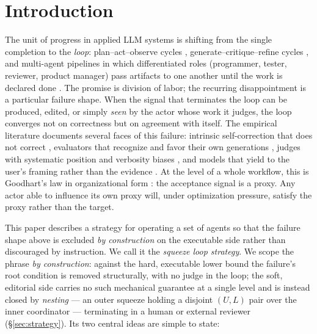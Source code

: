 \documentclass[11pt]{article}
\begin{document}
\section{Introduction}
\label{sec:intro}

The unit of progress in applied LLM systems is shifting from the single
completion to the \emph{loop}: plan--act--observe cycles
\citep{yao2022react,wang2023voyager}, generate--critique--refine cycles
\citep{madaan2023selfrefine,shinn2023reflexion}, and multi-agent pipelines in
which differentiated roles (programmer, tester, reviewer, product manager)
pass artifacts to one another until the work is declared done
\citep{li2023camel,wu2023autogen,hong2023metagpt,qian2023chatdev}. The promise
is division of labor; the recurring disappointment is a particular failure
shape. When the signal that terminates the loop can be produced, edited, or
simply \emph{seen} by the actor whose work it judges, the loop converges not on
correctness but on agreement with itself. The empirical literature documents
several faces of this failure: intrinsic self-correction that does not correct
\citep{huang2023cannot}, evaluators that recognize and favor their own
generations \citep{panickssery2024llm}, judges with systematic position and
verbosity biases \citep{zheng2023judging}, and models that yield to the user's
framing rather than the evidence \citep{sharma2023sycophancy}. At the level of
a whole workflow, this is Goodhart's law in organizational form
\citep{manheim2018goodhart,krakovna2020specification,amodei2016concrete}: the
acceptance signal is a proxy. Any actor able to influence its own proxy will,
under optimization pressure, satisfy the proxy rather than the target.

This paper describes a strategy for operating a set of agents so that the
failure shape above is excluded \emph{by construction} on the executable side
rather than discouraged by instruction. We call it the \emph{squeeze loop
strategy}. We scope the phrase \emph{by construction}: against the hard,
executable lower bound the failure's root condition is removed structurally,
with no judge in the loop; the soft, editorial side carries no such mechanical
guarantee at a single level and is instead closed by \emph{nesting} --- an
outer squeeze holding a disjoint $(U,L)$ pair over the inner coordinator ---
terminating in a human or external reviewer (\S\ref{sec:strategy}). Its two
central ideas are simple to state:
\end{document}
